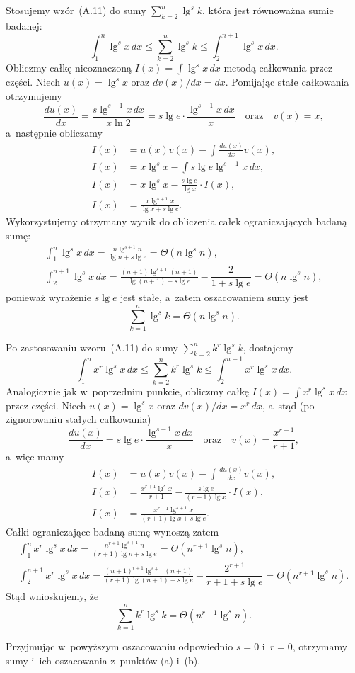 \subexercise{} %
Stosujemy wzór~(A.11) do sumy $\sum_{k=2}^n\lg^sk$, która jest równoważna sumie badanej:
\[
	\int_1^n\lg^sx\,dx \le \sum_{k=2}^n\lg^sk \le \int_2^{n+1}\lg^sx\,dx.
\]
Obliczmy całkę nieoznaczoną $I(x) = \int\lg^sx\,dx$ metodą całkowania przez części. Niech $u(x)=\lg^sx$ oraz $dv(x)/dx=dx$. Pomijając stałe całkowania otrzymujemy
\[
	\frac{du(x)}{dx} = \frac{s\lg^{s-1}x\,dx}{x\ln 2} = s\lg e\cdot\frac{\lg^{s-1}x\,dx}{x} \quad\text{oraz}\quad v(x) = x,
\]
a~następnie obliczamy
\begin{align*}
	I(x) &= u(x)v(x)-\int\frac{du(x)}{dx}v(x), \\
	I(x) &= x\lg^sx-\int s\lg e\lg^{s-1}x\,dx, \\
	I(x) &= x\lg^sx-\frac{s\lg e}{\lg x}\cdot I(x), \\
	I(x) &= \frac{x\lg^{s+1}x}{\lg x+s\lg e}.
\end{align*}
Wykorzystujemy otrzymany wynik do obliczenia całek ograniczających badaną sumę:
\begin{gather*}
	{\int_1^n\lg^sx\,dx} = \frac{n\lg^{s+1}n}{\lg n+s\lg e} = \Theta(n\lg^sn), \\[2mm]
	{\int_2^{n+1}\lg^sx\,dx} = \frac{(n+1)\lg^{s+1}(n+1)}{\lg(n+1)+s\lg e}-\dfrac{2}{1+s\lg e} = \Theta(n\lg^sn),
\end{gather*}
ponieważ wyrażenie $s\lg e$ jest stałe, a~zatem oszacowaniem sumy jest
\[
	\sum_{k=1}^n\lg^sk = \Theta(n\lg^sn).
\]

\subexercise{} %
Po zastosowaniu wzoru~(A.11) do sumy $\sum_{k=2}^nk^r\lg^sk$, dostajemy
\[
	\int_1^nx^r\lg^sx\,dx \le \sum_{k=2}^nk^r\lg^sk \le \int_2^{n+1}x^r\lg^sx\,dx.
\]
Analogicznie jak w~poprzednim punkcie, obliczmy całkę $I(x) = \int x^r\lg^sx\,dx$ przez części. Niech $u(x)=\lg^sx$ oraz $dv(x)/dx=x^r\,dx$, a~stąd (po zignorowaniu stałych całkowania)
\[
	\frac{du(x)}{dx} = s\lg e\cdot\frac{\lg^{s-1}x\,dx}{x} \quad\text{oraz}\quad v(x) = \frac{x^{r+1}}{r+1},
\]
a~więc mamy
\begin{align*}
	I(x) &= u(x)v(x)-\int\frac{du(x)}{dx}v(x), \\
	I(x) &= \frac{x^{r+1}\lg^sx}{r+1}-\frac{s\lg e}{(r+1)\lg x}\cdot I(x), \\
	I(x) &= \frac{x^{r+1}\lg^{s+1}x}{(r+1)\lg x+s\lg e}.
\end{align*}
Całki ograniczające badaną sumę wynoszą zatem
\begin{gather*}
	{\int_1^nx^r\lg^sx\,dx} = \frac{n^{r+1}\lg^{s+1}n}{(r+1)\lg n+s\lg e} = \Theta(n^{r+1}\lg^sn), \\[2mm]
	{\int_2^{n+1}x^r\lg^sx\,dx} = \frac{(n+1)^{r+1}\lg^{s+1}(n+1)}{(r+1)\lg(n+1)+s\lg e}-\dfrac{2^{r+1}}{r+1+s\lg e} = \Theta(n^{r+1}\lg^sn).
\end{gather*}
Stąd wnioskujemy, że
\[
	\sum_{k=1}^nk^r\lg^sk = \Theta(n^{r+1}\lg^sn).
\]

Przyjmując w~powyższym oszacowaniu odpowiednio $s=0$ i~$r=0$, otrzymamy sumy i~ich oszacowania z~punktów (a) i~(b).

\endinput
